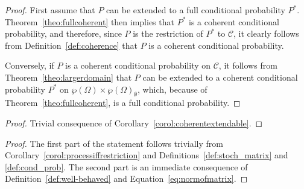\documentclass[10pt,a4paper]{paper}
\theoremstyle{definition}
\newcommand{\paths}{\Omega}
\newcommand{\power}{\wp(\paths)}
\newcommand{\nonemptypower}{\power_{\emptyset}}
\begin{document}
\corolcoherentextendable*
\begin{proof}
First assume that $P$ can be extended to a full conditional probability $P^*$. Theorem~\ref{theo:fullcoherent} then implies that $P^*$ is a coherent conditional probability, and therefore, since $P$ is the restriction of $P^*$ to $\mathcal{C}$, it clearly follows from Definition~\ref{def:coherence} that $P$ is a coherent conditional probability.

Conversely, if $P$ is a coherent conditional probability on $\mathcal{C}$, it follows from Theorem~\ref{theo:largerdomain} that $P$ can be extended to a coherent conditional probability $P^*$ on $\power\times\nonemptypower$, which, because of Theorem~\ref{theo:fullcoherent}, is a full conditional probability.
\end{proof}

\corolprocessiffrestriction*
\begin{proof}
Trivial consequence of Corollary~\ref{corol:coherentextendable}.
\end{proof}

\propstochasticprocesssimpleproperties*
\begin{proof}
The first part of the statement follows trivially from Corollary~\ref{corol:processiffrestriction} and Definitions~\ref{def:stoch_matrix} and \ref{def:cond_prob}. The second part is an immediate consequence of Definition~\ref{def:well-behaved} and Equation~\eqref{eq:normofmatrix}.
\end{proof}
\end{document}
